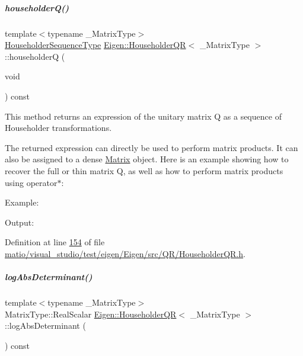 \mbox{\label{group___q_r___module_affd506c10ef2d25f56e7b1f9f25ff885}} 
\subparagraph{\texorpdfstring{householder\+Q()}{householderQ()}\hspace{0.1cm}{\footnotesize\ttfamily [2/2]}}
{\footnotesize\ttfamily template$<$typename \+\_\+\+Matrix\+Type$>$ \\
\hyperlink{group___householder___module_class_eigen_1_1_householder_sequence}{Householder\+Sequence\+Type} \hyperlink{group___q_r___module_class_eigen_1_1_householder_q_r}{Eigen\+::\+Householder\+QR}$<$ \+\_\+\+Matrix\+Type $>$\+::householderQ (\begin{DoxyParamCaption}\item[{void}]{ }\end{DoxyParamCaption}) const\hspace{0.3cm}{\ttfamily [inline]}}

This method returns an expression of the unitary matrix Q as a sequence of Householder transformations.

The returned expression can directly be used to perform matrix products. It can also be assigned to a dense \hyperlink{group___core___module_class_eigen_1_1_matrix}{Matrix} object. Here is an example showing how to recover the full or thin matrix Q, as well as how to perform matrix products using operator$\ast$\+:

Example\+: 
\begin{DoxyCodeInclude}
\end{DoxyCodeInclude}
 Output\+: 
\begin{DoxyVerbInclude}
\end{DoxyVerbInclude}
 

Definition at line \hyperlink{matio_2visual__studio_2test_2eigen_2_eigen_2src_2_q_r_2_householder_q_r_8h_source_l00154}{154} of file \hyperlink{matio_2visual__studio_2test_2eigen_2_eigen_2src_2_q_r_2_householder_q_r_8h_source}{matio/visual\+\_\+studio/test/eigen/\+Eigen/src/\+Q\+R/\+Householder\+Q\+R.\+h}.

\mbox{\label{group___q_r___module_a4bbcaaa2589939acd169c324b6b1907e}} 
\subparagraph{\texorpdfstring{log\+Abs\+Determinant()}{logAbsDeterminant()}\hspace{0.1cm}{\footnotesize\ttfamily [1/2]}}
{\footnotesize\ttfamily template$<$typename \+\_\+\+Matrix\+Type$>$ \\
Matrix\+Type\+::\+Real\+Scalar \hyperlink{group___q_r___module_class_eigen_1_1_householder_q_r}{Eigen\+::\+Householder\+QR}$<$ \+\_\+\+Matrix\+Type $>$\+::log\+Abs\+Determinant (\begin{DoxyParamCaption}{ }\end{DoxyParamCaption}) const}

